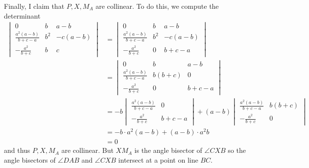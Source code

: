 Finally, I claim that $P,X,M_A$ are collinear. To do this, we compute the determinant
\begin{align*}
	\begin{vmatrix}
		0 & b & a-b \\
		\frac{a^2(a-b)}{b+c-a} & b^2 & -c(a-b) \\
		-\frac{a^2}{b+c} & b & c
	\end{vmatrix}
	&=
	\begin{vmatrix}
		0 & b & a-b \\
		\frac{a^2(a-b)}{b+c-a} & b^2 & -c(a-b) \\
		-\frac{a^2}{b+c} & 0 & b+c-a
	\end{vmatrix}
	\\
	&=
	\begin{vmatrix}
		0 & b & a-b \\
		\frac{a^2(a-b)}{b+c-a} & b(b+c) & 0 \\
		-\frac{a^2}{b+c} & 0 & b+c-a
	\end{vmatrix}
	\\
	&=-b
	\begin{vmatrix}
		\frac{a^2(a-b)}{b+c-a} & 0 \\
		-\frac{a^2}{b+c} & b+c-a
	\end{vmatrix}
	+(a-b)
	\begin{vmatrix}
		\frac{a^2(a-b)}{b+c-a} & b(b+c) \\
		-\frac{a^2}{b+c} & 0
	\end{vmatrix}
	\\
	&=-b\cdot a^2(a-b)+(a-b)\cdot a^2b\\
	&=0
\end{align*}
and thus $P,X,M_A$ are collinear. But $XM_A$ is the angle bisector of $\angle{CXB}$ so the angle bisectors of $\angle{DAB}$ and $\angle{CXB}$ intersect at a point on line $BC$.